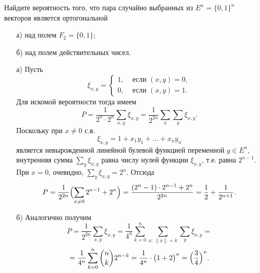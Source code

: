 \begin{problem}
Найдите вероятность того, что пара случайно выбранных из $E^n=\{ 0,1\}^n$ векторов является ортогональной 
\begin{enumerate}
\item[а)] над полем $F_2=\{ 0,1\}$; 

\item[б)] над полем действительных чисел. 
\end{enumerate}
\end{problem}

\begin{solution}
\begin{enumerate}
\item[а)]
Пусть 
$$
\xi_{x,y}=\begin{cases}
1, &\text{ если } (x,y)=0,\\
0, &\text{ если } (x,y)=1.
\end{cases}
$$
Для искомой вероятности тогда имеем 
$$
P=\frac{1}{2^n\cdot 2^n}\sum\limits_{x,y}\xi_{x,y}=\frac{1}{2^{2n}} \sum\limits_{x}\sum\limits_{y}\xi_{x,y} . 
$$
Поскольку при $x\ne 0$ с.в. 
$$
\xi_{x,y}=1+x_1 y_1+\ldots +x_n y_n 
$$
является невырожденной линейной булевой функцией переменной $y\in E^n$, внутренняя сумма $\sum\limits_{y}\xi_{x,y}$ 
равна числу нулей функции $\xi_{x,y}$, т.е. равна $2^{n-1}$. При $x=0$, очевидно, $\sum\limits_{y}\xi_{x,y}=2^n$. Отсюда 
$$
P=\frac{1}{2^{2n}}\Bigl(\sum\limits_{x\ne 0}2^{n-1}+2^n \Bigr)=\frac{(2^n -1)\cdot 2^{n-1}+2^n}{2^{2n}}=\frac{1}{2}+
\frac{1}{2^{n+1}} . 
$$

\item[б)] Аналогично получим 
$$
P=\frac{1}{2^{2n}}\sum\limits_{x,y}\xi_{x,y}=\frac{1}{4^n}\sum\limits_{k=0}^{n} \sum\limits_{x:\, \| x\|=k} 
\sum\limits_{y} \xi_{x,y}=
$$
$$
=\frac{1}{4^n}\sum\limits_{k=0}^{n} {n\choose k}2^{n-k}=
\frac{1}{4^n}\cdot\bigl( 1+2\bigr)^n=\Bigl(\frac{3}{4}\Bigr)^n . 
$$

\end{enumerate}
\end{solution}